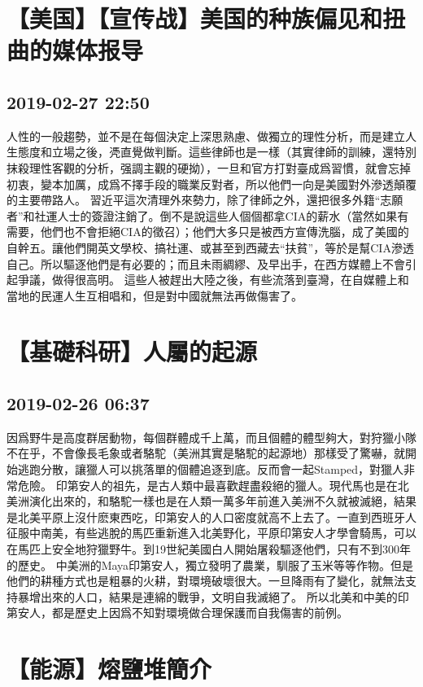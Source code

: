 \documentclass[twocolumn]{ctexart}
\begin{document}
\section*{【美国】【宣传战】美国的种族偏见和扭曲的媒体报导}
\subsection*{2019-02-27 22:50}

人性的一般趨勢，並不是在每個決定上深思熟慮、做獨立的理性分析，而是建立人生態度和立場之後，凴直覺做判斷。這些律師也是一樣（其實律師的訓練，還特別抹殺理性客觀的分析，强調主觀的硬拗），一旦和官方打對臺成爲習慣，就會忘掉初衷，變本加厲，成爲不擇手段的職業反對者，所以他們一向是美國對外滲透顛覆的主要帶路人。
習近平這次清理外來勢力，除了律師之外，還把很多外籍“志願者”和社運人士的簽證注銷了。倒不是說這些人個個都拿CIA的薪水（當然如果有需要，他們也不會拒絕CIA的徵召）；他們大多只是被西方宣傳洗腦，成了美國的自幹五。讓他們開英文學校、搞社運、或甚至到西藏去“扶貧”，等於是幫CIA滲透自己。所以驅逐他們是有必要的；而且未雨綢繆、及早出手，在西方媒體上不會引起爭議，做得很高明。
這些人被趕出大陸之後，有些流落到臺灣，在自媒體上和當地的民運人生互相唱和，但是對中國就無法再做傷害了。
\section*{【基礎科研】人屬的起源}
\subsection*{2019-02-26 06:37}

因爲野牛是高度群居動物，每個群體成千上萬，而且個體的體型夠大，對狩獵小隊不在乎，不會像長毛象或者駱駝（美洲其實是駱駝的起源地）那樣受了驚嚇，就開始逃跑分散，讓獵人可以挑落單的個體追逐到底。反而會一起Stamped，對獵人非常危險。
印第安人的祖先，是古人類中最喜歡趕盡殺絕的獵人。現代馬也是在北美洲演化出來的，和駱駝一樣也是在人類一萬多年前進入美洲不久就被滅絕，結果是北美平原上沒什麽東西吃，印第安人的人口密度就高不上去了。一直到西班牙人征服中南美，有些逃脫的馬匹重新進入北美野化，平原印第安人才學會騎馬，可以在馬匹上安全地狩獵野牛。到19世紀美國白人開始屠殺驅逐他們，只有不到300年的歷史。
中美洲的Maya印第安人，獨立發明了農業，馴服了玉米等等作物。但是他們的耕種方式也是粗暴的火耕，對環境破壞很大。一旦降雨有了變化，就無法支持暴增出來的人口，結果是連綿的戰爭，文明自我滅絕了。
所以北美和中美的印第安人，都是歷史上因爲不知對環境做合理保護而自我傷害的前例。
\section*{【能源】熔鹽堆簡介}
\end{document}
